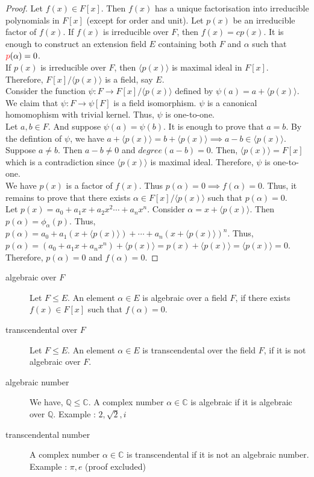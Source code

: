 \begin{proof}
	Let $f(x) \in F[x]$. Then $f(x)$ has a unique factorisation into irreducible polynomials in $F[x]$ (except for order and unit). Let $p(x)$ be an irreducible factor of $f(x)$. If $f(x)$ is irreducible over $F$, then $f(x) = cp(x)$. It is enough to construct an extension field $E$ containing both $F$ and $\alpha$ such that ${\color{red}p}(\alpha) = 0$.\\

	If $p(x)$ is irreducible over $F$, then $\langle p(x) \rangle$ is maximal ideal in $F[x]$. Therefore, $F[x]/\langle p(x) \rangle$ is a field, say $E$.\\

	Consider the function $\psi : F \to F[x]/\langle p(x) \rangle$ defined by $\psi(a) = a+\langle p(x) \rangle$. We claim that $\psi : F \to \psi[F]$ is a field isomorphism. $\psi$ is a canonical homomophism with trivial kernel. Thus, $\psi$ is one-to-one.\\

	Let $a,b \in F$. And suppose $\psi(a) = \psi(b)$. It is enough to prove that $a = b$. By the defintion of $\psi$, we have $a+\langle p(x) \rangle = b + \langle p(x) \rangle \implies a-b \in \langle p(x) \rangle$. Suppose $a \ne b$. Then $a-b \ne 0$ and $degree(a-b) = 0$. Then, $\langle p(x) \rangle = F[x]$ which is a contradiction since $\langle p(x) \rangle$ is maximal ideal. Therefore, $\psi$ is one-to-one.\\
	
	We have $p(x)$ is a factor of $f(x)$. Thus $p(\alpha) = 0 \implies f(\alpha) = 0$. Thus, it remains to prove that there exists $\alpha \in F[x]/\langle p(x) \rangle$ such that $p(\alpha) = 0$.\\

	Let $p(x) = a_0 + a_1x + a_2 x^2\cdots + a_n x^n$. Consider $\alpha = x + \langle p(x) \rangle$. Then $p(\alpha) = \phi_\alpha(p)$. Thus, $p(\alpha) = a_0 + a_1(x+\langle p(x) \rangle) + \cdots + a_n(x + \langle p(x) \rangle)^n$. Thus, $p(\alpha) = (a_0+a_1x + a_n x^n) + \langle p(x) \rangle = p(x) + \langle p(x) \rangle = \langle p(x) \rangle = 0$. Therefore, $p(\alpha) = 0$ and $f(\alpha) = 0$.
\end{proof}

\begin{description}
	\item[algebraic over $F$] Let $F \le E$. An element $\alpha \in E$ is algebraic over a field $F$, if there exists $f(x) \in F[x]$ such that $f(\alpha) = 0$.
	\item[transcendental over $F$] Let $F \le E$. An element $\alpha \in E$ is transcendental over the field $F$, if it is not algebraic over $F$.
	\item[algebraic number] We have, $\mathbb{Q} \le \mathbb{C}$. A complex number $\alpha \in \mathbb{C}$ is algebraic if  it is algebraic over $\mathbb{Q}$. Example : $2,\sqrt{2},i$
	\item[transcendental number] A complex number $\alpha \in \mathbb{C}$ is transcendental if it is not an algebraic number. Example : $\pi,e$ (proof excluded)
\end{description}

